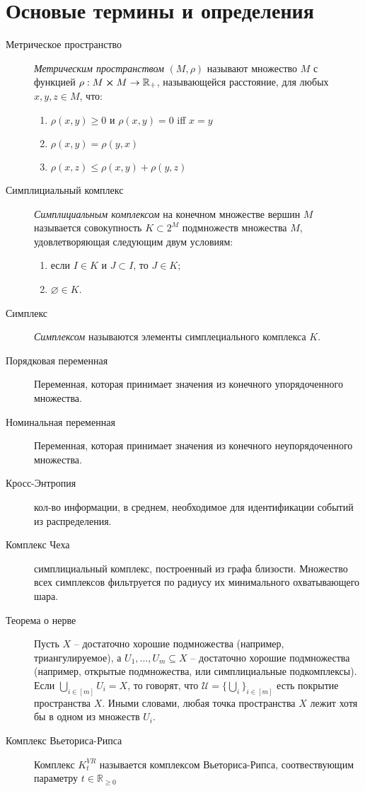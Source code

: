 \section{Основые термины и определения}

\begin{description}
    \item[Метрическое пространство] {\it Метрическим пространством} $(M, \rho)$ называют множество $M$ с функцией $\rho: M \cross M \rightarrow \mathbb{R}_{+}$, называющейся расстояние, для любых $x, y, z \in M$, что:
    \begin{enumerate}
        \item $\rho(x, y) \geq 0$ и $\rho(x, y) = 0$ iff $x = y$
        \item $\rho(x, y) = \rho(y, x)$
        \item $\rho(x, z) \leq \rho(x, y) + \rho(y, z)$
    \end{enumerate}
    \item[Симплициальный комплекс] {\it Симплициальным комплексом} на конечном множестве вершин $M$ называется совокупность $K \subset 2^{M}$ подмножеств множества $M$, удовлетворяющая следующим двум условиям:
    \begin{enumerate}
        \item если $I \in K$ и $J \subset I$, то $J \in K$;
        \item $\varnothing \in K$.
    \end{enumerate}
    \item[Симплекс] {\it Симплексом} называются элементы симплециального комплекса $K$.
    \item[Порядковая переменная] Переменная, которая принимает значения из конечного упорядоченного множества.
    \item[Номинальная переменная] Переменная, которая принимает значения из конечного неупорядоченного множества.
    \item[Кросс-Энтропия] кол-во информации, в среднем, необходимое для идентификации событий из распределения.
    \item[Комплекс Чеха] симплициальный комплекс, построенный из графа близости. Множество всех симплексов фильтруется по радиусу их минимального охватывающего шара.
    \item[Теорема о нерве] Пусть $X$ -- достаточно хорошие подмножества (например, триангулируемое), а $U_1, ..., U_m \subseteq X$ -- достаточно хорошие подмножества (например, открытые подмножества, или симплициальные подкомплексы). Если $\bigcup_{i \in [m]} U_i = X$, то говорят, что $\mathcal{U} = \{\bigcup_i\}_{i \in [m]}$ есть покрытие пространства $X$. Иными словами, любая точка пространства $X$ лежит хотя бы в одном из множеств $U_i$.
    \item[Комплекс Вьеториса-Рипса] Комплекс $K_t^{VR}$ называется комплексом Вьеториса-Рипса, соотвествующим параметру $t \in \mathbb{R}_{\geq 0}$
    
\end{description}
